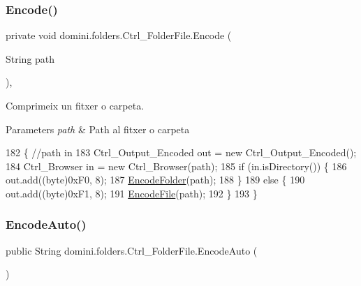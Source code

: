 \subsubsection{\texorpdfstring{Encode()}{Encode()}\hspace{0.1cm}{\footnotesize\ttfamily [2/2]}}
{\footnotesize\ttfamily private void domini.\+folders.\+Ctrl\+\_\+\+Folder\+File.\+Encode (\begin{DoxyParamCaption}\item[{String}]{path }\end{DoxyParamCaption})\hspace{0.3cm}{\ttfamily [inline]}, {\ttfamily [private]}}



Comprimeix un fitxer o carpeta. 


\begin{DoxyParams}{Parameters}
{\em path} & Path al fitxer o carpeta \\
\hline
\end{DoxyParams}

\begin{DoxyCode}
182                                      \{ \textcolor{comment}{//path in}
183         Ctrl\_Output\_Encoded out = \textcolor{keyword}{new} Ctrl\_Output\_Encoded();
184         Ctrl\_Browser in = \textcolor{keyword}{new} Ctrl\_Browser(path);
185         \textcolor{keywordflow}{if} (in.isDirectory()) \{
186             out.add((byte)0xF0, 8);
187             \hyperlink{classdomini_1_1folders_1_1Ctrl__FolderFile_a6b18175639009f0186307710fb88a18f}{EncodeFolder}(path);
188         \}
189         \textcolor{keywordflow}{else} \{
190             out.add((byte)0xF1, 8);
191             \hyperlink{classdomini_1_1folders_1_1Ctrl__FolderFile_a0b2b642b6c23124539d0306955be7f0c}{EncodeFile}(path);
192         \}
193     \}
\end{DoxyCode}
\mbox{\label{classdomini_1_1folders_1_1Ctrl__FolderFile_aa88b27fc271590c8c16642db5c1bb329}} 
\subsubsection{\texorpdfstring{Encode\+Auto()}{EncodeAuto()}}
{\footnotesize\ttfamily public String domini.\+folders.\+Ctrl\+\_\+\+Folder\+File.\+Encode\+Auto (\begin{DoxyParamCaption}{ }\end{DoxyParamCaption})\hspace{0.3cm}{\ttfamily [inline]}}




